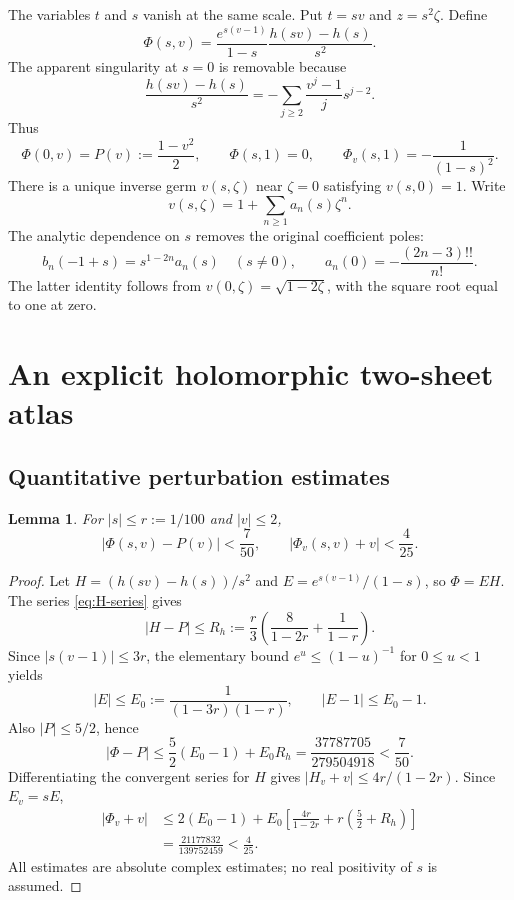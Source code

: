 \documentclass[11pt,a4paper]{article}
\newtheorem{lemma}[theorem]{Lemma}
\theoremstyle{definition}
\theoremstyle{remark}
\begin{document}
The variables $t$ and $s$ vanish at the same scale. Put $t=sv$ and
$z=s^2\zeta$. Define
\begin{equation}\label{eq:Phi}
 \Phi(s,v)=\frac{e^{s(v-1)}}{1-s}
 \frac{h(sv)-h(s)}{s^2}.
\end{equation}
The apparent singularity at $s=0$ is removable because
\begin{equation}\label{eq:H-series}
 \frac{h(sv)-h(s)}{s^2}
 =-\sum_{j\ge2}\frac{v^j-1}{j}s^{j-2}.
\end{equation}
Thus
\begin{equation}\label{eq:Phi-zero}
 \Phi(0,v)=P(v):=\frac{1-v^2}{2},\qquad
 \Phi(s,1)=0,\qquad \Phi_v(s,1)=-\frac1{(1-s)^2}.
\end{equation}
There is a unique inverse germ $v(s,\zeta)$ near $\zeta=0$ satisfying
$v(s,0)=1$. Write
\begin{equation}\label{eq:an}
 v(s,\zeta)=1+\sum_{n\ge1}a_n(s)\zeta^n.
\end{equation}
The analytic dependence on $s$ removes the original coefficient poles:
\begin{equation}\label{eq:normalization}
 b_n(-1+s)=s^{1-2n}a_n(s)\quad(s\ne0),\qquad
 a_n(0)=-\frac{(2n-3)!!}{n!}.
\end{equation}
The latter identity follows from $v(0,\zeta)=\sqrt{1-2\zeta}$, with the
square root equal to one at zero.

\section{An explicit holomorphic two-sheet atlas}
\label{sec:atlas}

\subsection{Quantitative perturbation estimates}
\begin{lemma}\label{lem:bounds}
For $|s|\le r:=1/100$ and $|v|\le2$,
\begin{equation}\label{eq:Phi-bounds}
 |\Phi(s,v)-P(v)|<\frac7{50},\qquad
 |\Phi_v(s,v)+v|<\frac4{25}.
\end{equation}
\end{lemma}
\begin{proof}
Let $H=(h(sv)-h(s))/s^2$ and $E=e^{s(v-1)}/(1-s)$, so $\Phi=EH$.
The series \eqref{eq:H-series} gives
\[
 |H-P|\le R_h:=\frac r3\left(\frac8{1-2r}+\frac1{1-r}\right).
\]
Since $|s(v-1)|\le3r$, the elementary bound
$e^u\le(1-u)^{-1}$ for $0\le u<1$ yields
\[
 |E|\le E_0:=\frac1{(1-3r)(1-r)},\qquad |E-1|\le E_0-1.
\]
Also $|P|\le5/2$, hence
\[
 |\Phi-P|\le\frac52(E_0-1)+E_0R_h
 =\frac{37787705}{279504918}<\frac7{50}.
\]
Differentiating the convergent series for $H$ gives
$|H_v+v|\le4r/(1-2r)$. Since $E_v=sE$,
\begin{align*}
 |\Phi_v+v|
 &\le2(E_0-1)+E_0\left[\frac{4r}{1-2r}
                  +r\left(\frac52+R_h\right)\right]\\
 &=\frac{21177832}{139752459}<\frac4{25}.
\end{align*}
All estimates are absolute complex estimates; no real positivity of $s$
is assumed.
\end{proof}
\end{document}
